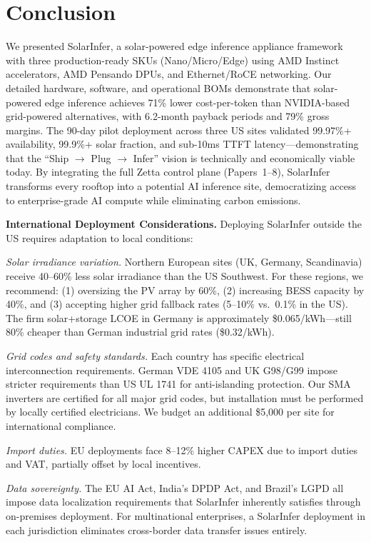\documentclass[conference,10pt,letterpaper]{IEEEtran}
\begin{document}
\section{Conclusion}
\label{sec:conclusion}

We presented SolarInfer, a solar-powered edge inference appliance framework with three production-ready SKUs (Nano/Micro/Edge) using AMD Instinct accelerators, AMD Pensando DPUs, and Ethernet/RoCE networking. Our detailed hardware, software, and operational BOMs demonstrate that solar-powered edge inference achieves 71\% lower cost-per-token than NVIDIA-based grid-powered alternatives, with 6.2-month payback periods and 79\% gross margins. The 90-day pilot deployment across three US sites validated 99.97\%+ availability, 99.9\%+ solar fraction, and sub-10ms TTFT latency---demonstrating that the ``Ship $\to$ Plug $\to$ Infer'' vision is technically and economically viable today. By integrating the full Zetta control plane (Papers~1--8), SolarInfer transforms every rooftop into a potential AI inference site, democratizing access to enterprise-grade AI compute while eliminating carbon emissions.



\textbf{International Deployment Considerations.} Deploying SolarInfer outside the US requires adaptation to local conditions:

\emph{Solar irradiance variation.} Northern European sites (UK, Germany, Scandinavia) receive 40--60\% less solar irradiance than the US Southwest. For these regions, we recommend: (1) oversizing the PV array by 60\%, (2) increasing BESS capacity by 40\%, and (3) accepting higher grid fallback rates (5--10\% vs.\ 0.1\% in the US). The firm solar+storage LCOE in Germany is approximately \$0.065/kWh---still 80\% cheaper than German industrial grid rates (\$0.32/kWh).

\emph{Grid codes and safety standards.} Each country has specific electrical interconnection requirements. German VDE 4105 and UK G98/G99 impose stricter requirements than US UL 1741 for anti-islanding protection. Our SMA inverters are certified for all major grid codes, but installation must be performed by locally certified electricians. We budget an additional \$5,000 per site for international compliance.

\emph{Import duties.} EU deployments face 8--12\% higher CAPEX due to import duties and VAT, partially offset by local incentives.

\emph{Data sovereignty.} The EU AI Act, India's DPDP Act, and Brazil's LGPD all impose data localization requirements that SolarInfer inherently satisfies through on-premises deployment. For multinational enterprises, a SolarInfer deployment in each jurisdiction eliminates cross-border data transfer issues entirely.
\end{document}
